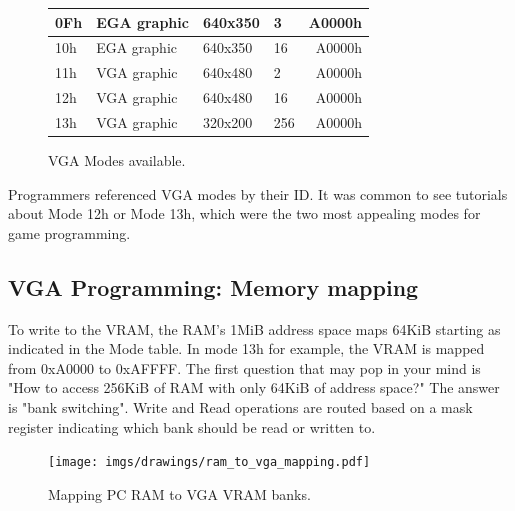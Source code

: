 \documentclass[book.tex]{subfiles}
\begin{document}
\begin{figure}[H]
\begin{table}[H]
\begin{tabularx}{\textwidth}[c]{llllr}
0Fh           & EGA graphic   & 640x350         & 3               & A0000h                                \\ \hline
10h           & EGA graphic   & 640x350         & 16              & A0000h                                \\ \hline
11h           & VGA graphic   & 640x480         & 2               & A0000h                                \\ \hline
12h           & VGA graphic   & 640x480         & 16              & A0000h                                \\ \hline
13h           & VGA graphic   & 320x200         & 256             & A0000h                                \\ \hline
\end{tabularx}
\end{table}
\caption{VGA Modes available.}\label{fig:vga_modes}
 \end{figure}
 
 Programmers referenced VGA modes by their ID. It was common to see tutorials about Mode 12h or Mode 13h, which were the two most appealing modes for game programming.


 \subsection{VGA Programming: Memory mapping}
To write to the VRAM, the RAM's 1MiB address space maps 64KiB starting as indicated in the Mode table. In mode 13h for example, the VRAM is mapped from 0xA0000 to 0xAFFFF. The first question that may pop in your mind is "How to access 256KiB of RAM with only 64KiB of address space?" The answer is "bank switching". Write and Read operations are routed based on a mask register indicating which bank should be read or written to.\\
\par
 \begin{figure}[H]
\centering
  
      \texttt{[image: imgs/drawings/ram\_to\_vga\_mapping.pdf]}
    
\caption{Mapping PC RAM to VGA VRAM banks.}
\end{figure}



 
\end{document}
